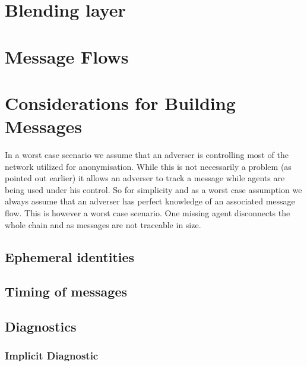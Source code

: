 
\section{Blending layer}

\section{Message Flows}

\section{Considerations for Building Messages}
In a worst case scenario we assume that an adverser is controlling most of the network utilized for anonymisation. While this is not necessarily a problem (as pointed out earlier) it allows an adverser to track a message while agents are being used under his control. So for simplicity and as a worst case assumption we always assume that an adverser has perfect knowledge of an associated message flow. This is however a worst case scenario. One missing agent disconnects the whole chain and as messages are not traceable in size.


\subsection{Ephemeral identities}

\subsection{Timing of messages}

\subsection{Diagnostics}

\subsubsection{Implicit Diagnostic}

